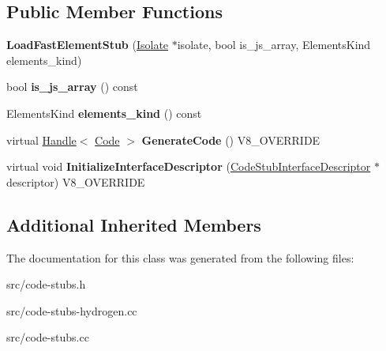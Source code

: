 \subsection*{Public Member Functions}
\begin{DoxyCompactItemize}
\item 
\hypertarget{classv8_1_1internal_1_1_load_fast_element_stub_ab71cb989176f9b46638ce35d228ac2d1}{}{\bfseries Load\+Fast\+Element\+Stub} (\hyperlink{classv8_1_1internal_1_1_isolate}{Isolate} $\ast$isolate, bool is\+\_\+js\+\_\+array, Elements\+Kind elements\+\_\+kind)\label{classv8_1_1internal_1_1_load_fast_element_stub_ab71cb989176f9b46638ce35d228ac2d1}

\item 
\hypertarget{classv8_1_1internal_1_1_load_fast_element_stub_a1640f31d40de468f196d608f8d28e075}{}bool {\bfseries is\+\_\+js\+\_\+array} () const \label{classv8_1_1internal_1_1_load_fast_element_stub_a1640f31d40de468f196d608f8d28e075}

\item 
\hypertarget{classv8_1_1internal_1_1_load_fast_element_stub_a17070f8615e939a61c268904fac286b8}{}Elements\+Kind {\bfseries elements\+\_\+kind} () const \label{classv8_1_1internal_1_1_load_fast_element_stub_a17070f8615e939a61c268904fac286b8}

\item 
\hypertarget{classv8_1_1internal_1_1_load_fast_element_stub_a8d0c3f2d732cce417b40919032406c57}{}virtual \hyperlink{classv8_1_1internal_1_1_handle}{Handle}$<$ \hyperlink{classv8_1_1internal_1_1_code}{Code} $>$ {\bfseries Generate\+Code} () V8\+\_\+\+O\+V\+E\+R\+R\+I\+D\+E\label{classv8_1_1internal_1_1_load_fast_element_stub_a8d0c3f2d732cce417b40919032406c57}

\item 
\hypertarget{classv8_1_1internal_1_1_load_fast_element_stub_a0bbcdc1fa940f47a75f07a127a041481}{}virtual void {\bfseries Initialize\+Interface\+Descriptor} (\hyperlink{classv8_1_1internal_1_1_code_stub_interface_descriptor}{Code\+Stub\+Interface\+Descriptor} $\ast$descriptor) V8\+\_\+\+O\+V\+E\+R\+R\+I\+D\+E\label{classv8_1_1internal_1_1_load_fast_element_stub_a0bbcdc1fa940f47a75f07a127a041481}

\end{DoxyCompactItemize}
\subsection*{Additional Inherited Members}


The documentation for this class was generated from the following files\+:\begin{DoxyCompactItemize}
\item 
src/code-\/stubs.\+h\item 
src/code-\/stubs-\/hydrogen.\+cc\item 
src/code-\/stubs.\+cc\end{DoxyCompactItemize}
